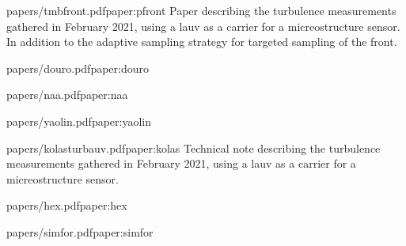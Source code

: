 




\begin{paper}{papers/tmbfront.pdf}{paper:pfront}
Paper describing the turbulence measurements gathered in February 2021, using a \acrshort{lauv} as a carrier for a micreostructure sensor. In addition to the adaptive sampling strategy for targeted sampling of the front.  
\end{paper}

\begin{paper}{papers/douro.pdf}{paper:douro}
\end{paper}


\begin{paper}{papers/naa.pdf}{paper:naa}
\end{paper}

\begin{paper}{papers/yaolin.pdf}{paper:yaolin}
\end{paper}

\begin{paper}{papers/kolasturbauv.pdf}{paper:kolas}
    Technical note describing the turbulence measurements gathered in February 2021, using a \acrshort{lauv} as a carrier for a micreostructure sensor. 
    \begin{quote}
    \end{quote}
\end{paper}

\begin{paper}{papers/hex.pdf}{paper:hex}
\end{paper}


\begin{paper}{papers/simfor.pdf}{paper:simfor}
\end{paper}


